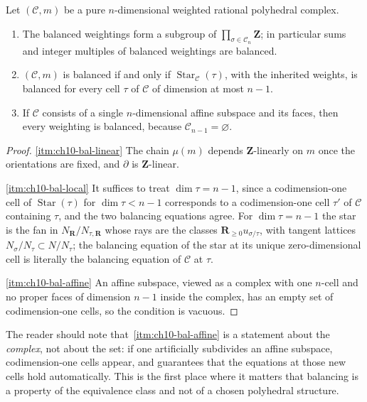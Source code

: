 \begin{corollary}
\label{cor:ch10-balancing-consequences}
Let $(\mathscr C,m)$ be a pure $n$-dimensional weighted rational polyhedral
complex.
\begin{enumerate}
\item\label{itm:ch10-bal-linear} The balanced weightings form a subgroup of
      $\prod_{\sigma\in\mathscr C_n}\mathbf Z$; in particular sums and
      integer multiples of balanced weightings are balanced.
\item\label{itm:ch10-bal-local} $(\mathscr C,m)$ is balanced if and only if
      $\operatorname{Star}_{\mathscr C}(\tau)$, with the inherited weights,
      is balanced for every cell $\tau$ of $\mathscr C$ of dimension at most
      $n-1$.
\item\label{itm:ch10-bal-affine} If $\mathscr C$ consists of a single
      $n$-dimensional affine subspace and its faces, then every weighting is
      balanced, because $\mathscr C_{n-1}=\varnothing$.
\end{enumerate}
\end{corollary}

\begin{proof}
\cref{itm:ch10-bal-linear} The chain $\mu(m)$ depends
$\mathbf Z$-linearly on $m$ once the orientations are fixed, and $\partial$
is $\mathbf Z$-linear.

\cref{itm:ch10-bal-local} It suffices to treat $\dim\tau=n-1$, since a
codimension-one cell of $\operatorname{Star}(\tau)$ for $\dim\tau<n-1$
corresponds to a codimension-one cell $\tau'$ of $\mathscr C$ containing
$\tau$, and the two balancing equations agree.  For $\dim\tau=n-1$ the star
is the fan in $N_{\mathbf R}/N_{\tau,\mathbf R}$ whose rays are the classes
$\mathbf R_{\geq0}u_{\sigma/\tau}$, with tangent lattices
$N_\sigma/N_\tau\subset N/N_\tau$; the balancing equation of the star at its
unique zero-dimensional cell is literally the balancing equation of
$\mathscr C$ at $\tau$.

\cref{itm:ch10-bal-affine} An affine subspace, viewed as a complex with
one $n$-cell and no proper faces of dimension $n-1$ inside the complex, has
an empty set of codimension-one cells, so the condition is vacuous.
\end{proof}

The reader should note that
\,\cref{itm:ch10-bal-affine} is a
statement about the \emph{complex}, not about the set: if one artificially
subdivides an affine subspace, codimension-one cells appear, and
 guarantees that the equations at those
new cells hold automatically.  This is the first place where it matters that
balancing is a property of the equivalence class and not of a chosen
polyhedral structure.

